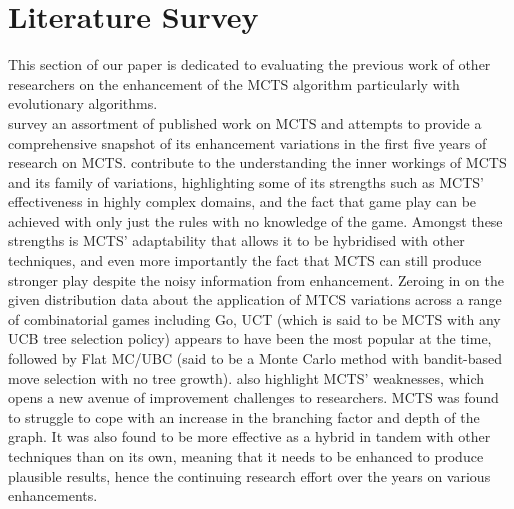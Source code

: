 \documentclass{llncs}
\begin{document}
\section{Literature Survey} \label{sec:lit}

This section of our paper is dedicated to evaluating the previous work of other researchers on the enhancement of the MCTS algorithm particularly with evolutionary algorithms.\\

\noindent
\cite{Browne2012} survey an assortment of published work on MCTS and attempts to provide a comprehensive snapshot of its enhancement variations in the first five years of research on MCTS. \cite{Browne2012} contribute to the understanding the inner workings of MCTS and its family of variations, highlighting some of its strengths such as MCTS’ effectiveness in highly complex domains, and the fact that game play can be achieved with only just the rules with no knowledge of the game. Amongst these strengths is MCTS’ adaptability that allows it to be hybridised with other techniques, and even more importantly the fact that MCTS can still produce stronger play despite the noisy information from enhancement. Zeroing in on the given distribution data about the application of MTCS variations across a range of combinatorial games including Go, UCT (which is said to be MCTS with any UCB tree selection policy) appears to have been the most popular at the time, followed by Flat MC/UBC (said to be a Monte Carlo method with bandit-based move selection with no tree growth). \cite{Browne2012} also highlight MCTS’ weaknesses, which opens a new avenue of improvement challenges to researchers. MCTS was found to struggle to cope with an increase in the branching factor and depth of the graph. It was also found to be more effective as a hybrid in tandem with other techniques than on its own, meaning that it needs to be enhanced to produce plausible results, hence the continuing research effort over the years on various enhancements.\\
\end{document}

